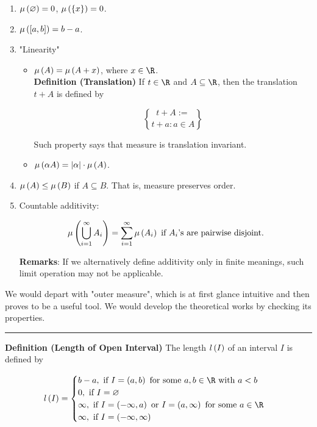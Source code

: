 \documentclass[
]{article}
\begin{document}
\begin{enumerate}
\def\labelenumi{\arabic{enumi}.}
\item
  \(\mu\left(\varnothing\right) = 0\), \(\mu\left(\left\{x\right\}\right) = 0\).
\item
  \(\mu\left(\left[a,b\right]\right) = b-a\).
\item
  "Linearity"

  \begin{itemize}
  \item
    \(\mu\left(A\right) = \mu\left(A+x\right)\), where \(x\in \R\). \\
    \textbf{Definition (Translation)} If \(t\in \R\) and
    \(A\subseteq \R\), then the translation \(t+A\) is defined by

    \[t+A:= \brace{t+a:a\in A}\]

    Such property says that measure is translation invariant.
  \item
    \(\mu\left(\alpha A\right) = |\alpha|\cdot \mu\left(A\right)\).
  \end{itemize}
\item
  \(\mu\left(A\right)\le \mu\left(B\right)\) if \(A\subseteq B\). That is, measure
  preserves order.
\item
  Countable additivity:

  \[\mu\left(\bigcup_{i = 1}^{\infty}A_i\right) = \sum_{i = 1}^{\infty}\mu\left(A_i\right) \text{ if }A_i \text{'s are pairwise disjoint.}\]

  \textbf{Remarks}: If we alternatively define additivity only in finite
  meanings, such limit operation may not be applicable.
\end{enumerate}

We would depart with "outer measure", which is at first glance intuitive
and then proves to be a useful tool. We would develop the theoretical
works by checking its properties.

\begin{center}\rule{0.5\linewidth}{0.5pt}\end{center}

\textbf{Definition (Length of Open Interval)} The length \(l\left(I\right)\) of
an interval \(I\) is defined by

\[l\pr{I} = \bc
b-a, \text{ if }I = \pr{a,b} \text{ for some }a,b\in \R\text{ with }a<b\\
0, \text{ if } I = \empty \\
\infty, \text{ if } I = \pr{-\infty,a} \text{ or }I = \pr{a,\infty} \text{ for some }a \in \R \\
\infty, \text{ if } I = \pr{-\infty,\infty}
\ec\]
\end{document}
